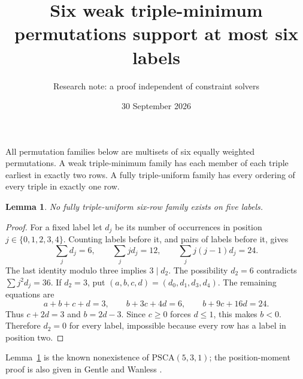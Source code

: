 \documentclass[11pt]{article}
\title{Six weak triple-minimum permutations support at most six labels}
\author{Research note: a proof independent of constraint solvers}
\date{30 September 2026}
\newtheorem{lemma}{Lemma}
\begin{document}
\maketitle
All permutation families below are multisets of six equally weighted
permutations. A weak triple-minimum family has each member of each
triple earliest in exactly two rows. A fully triple-uniform family
has every ordering of every triple in exactly one row.

\begin{lemma}\label{psca}
No fully triple-uniform six-row family exists on five labels.
\end{lemma}
\begin{proof}
For a fixed label let $d_j$ be its number of occurrences in position
$j\in\{0,1,2,3,4\}$. Counting labels before it, and pairs of labels
before it, gives
\[
 \sum_jd_j=6,\qquad \sum_jj d_j=12,\qquad
 \sum_jj(j-1)d_j=24.
\]
The last identity modulo three implies $3\mid d_2$.
The possibility $d_2=6$ contradicts $\sum j^2d_j=36$.
If $d_2=3$, put $(a,b,c,d)=(d_0,d_1,d_3,d_4)$. The remaining
equations are
\[
 a+b+c+d=3,\qquad b+3c+4d=6,\qquad b+9c+16d=24.
\]
Thus $c+2d=3$ and $b=2d-3$. Since $c\ge0$ forces $d\le1$,
this makes $b<0$. Therefore $d_2=0$ for every label, impossible
because every row has a label in position two.
\end{proof}
Lemma~\ref{psca} is the known nonexistence of
$\mathrm{PSCA}(5,3,1)$; the position-moment proof is also given in
Gentle and Wanless \cite{GW}.
\end{document}
